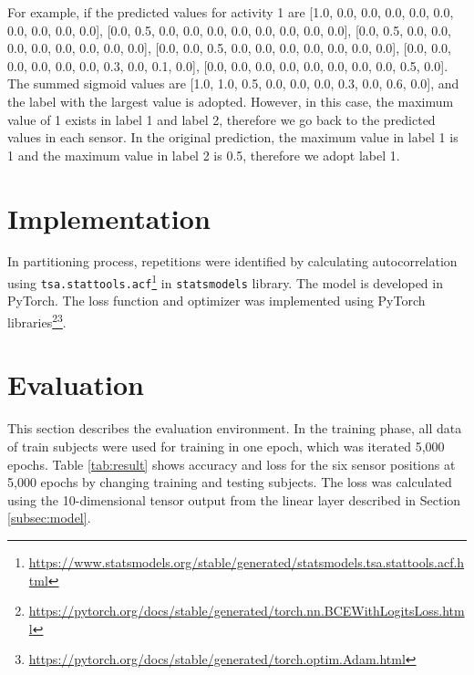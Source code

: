 \documentclass[graybox]{svmult}
\begin{document}
For example, if the predicted values for activity 1 are [1.0, 0.0, 0.0, 0.0, 0.0, 0.0, 0.0, 0.0, 0.0, 0.0], [0.0, 0.5, 0.0, 0.0, 0.0, 0.0, 0.0, 0.0, 0.0, 0.0], [0.0, 0.5, 0.0, 0.0, 0.0, 0.0, 0.0, 0.0, 0.0, 0.0], [0.0, 0.0, 0.5, 0.0, 0.0, 0.0, 0.0, 0.0, 0.0, 0.0], [0.0, 0.0, 0.0, 0.0, 0.0, 0.0, 0.3, 0.0, 0.1, 0.0], [0.0, 0.0, 0.0, 0.0, 0.0, 0.0, 0.0, 0.0, 0.5, 0.0].
The summed sigmoid values are [1.0, 1.0, 0.5, 0.0, 0.0, 0.0, 0.3, 0.0, 0.6, 0.0], and the label with the largest value is adopted. However, in this case, the maximum value of 1 exists in label 1 and label 2, therefore we go back to the predicted values in each sensor. In the original prediction, the maximum value in label 1 is 1 and the maximum value in label 2 is 0.5, therefore we adopt label 1.






\section{Implementation}
\label{sec:implementation}
In partitioning process, repetitions were identified by calculating autocorrelation using \texttt{tsa.stattools.acf}\footnote{\url{https://www.statsmodels.org/stable/generated/statsmodels.tsa.stattools.acf.html}} in \texttt{statsmodels} library. The model is developed in PyTorch. The loss function and optimizer was implemented using PyTorch libraries\footnote{\url{https://pytorch.org/docs/stable/generated/torch.nn.BCEWithLogitsLoss.html}}\footnote{\url{https://pytorch.org/docs/stable/generated/torch.optim.Adam.html}}.



\section{Evaluation}
\label{sec:evaluation}
This section describes the evaluation environment. In the training phase, all data of train subjects were used for training in one epoch, which was iterated 5,000 epochs. Table \ref{tab:result} shows accuracy and loss for the six sensor positions at 5,000 epochs by changing training and testing subjects. The loss was calculated using the 10-dimensional tensor output from the linear layer described in Section \ref{subsec:model}.
\end{document}
